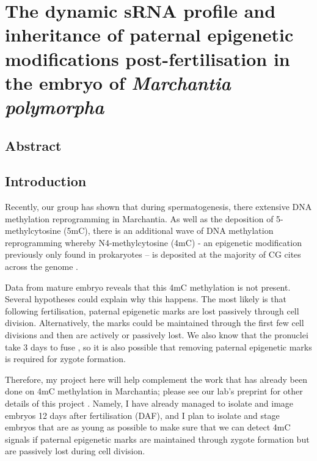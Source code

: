 \chapter{The dynamic sRNA profile and inheritance of paternal epigenetic modifications post-fertilisation in the embryo of \textit{Marchantia polymorpha}}

\ifpdf
    \graphicspath{{Chapter3/Figs/Raster/}{Chapter3/Figs/PDF/}{Chapter3/Figs/}}
\else
    \graphicspath{{Chapter3/Figs/Vector/}{Chapter3/Figs/}}
\fi


\section{Abstract}

\section{Introduction}

Recently, our group has shown that during spermatogenesis, there extensive DNA methylation reprogramming in Marchantia. As well as the deposition of 5-methylcytosine (5mC), there is an additional wave of DNA methylation reprogramming whereby N4-methylcytosine (4mC) - an epigenetic modification previously only found in prokaryotes – is deposited at the majority of CG cites across the genome \citep{RN189}. 

Data from mature embryo reveals that this 4mC methylation is not present. Several hypotheses could explain why this happens. The most likely is that following fertilisation, paternal epigenetic marks are lost passively through cell division. Alternatively, the marks could be maintained through the first few cell divisions and then are actively or passively lost. We also know that the pronuclei take 3 days to fuse \citep{RN139}, so it is also possible that removing paternal epigenetic marks is required for zygote formation. 

Therefore, my project here will help complement the work that has already been done on 4mC methylation in Marchantia; please see our lab’s preprint for other details of this project \citep{RN189}. Namely, I have already managed to isolate and image embryos 12 days after fertilisation (DAF), and I plan to isolate and stage embryos that are as young as possible to make sure that we can detect 4mC signals if paternal epigenetic marks are maintained through zygote formation but are passively lost during cell division.

